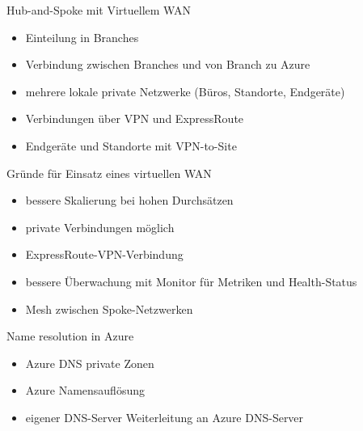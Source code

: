 \begin{flashcard}[]{Hub-and-Spoke mit Virtuellem WAN}
  \begin{itemize}
    \item Einteilung in Branches
    \item Verbindung zwischen Branches und von Branch zu Azure
    \item mehrere lokale private Netzwerke (Büros, Standorte, Endgeräte)
    \item Verbindungen über VPN und ExpressRoute
    \item Endgeräte und Standorte mit VPN-to-Site
  \end{itemize}
\end{flashcard}

\begin{flashcard}[]{Gründe für Einsatz eines virtuellen WAN}
  \begin{itemize}
    \item bessere Skalierung bei hohen Durchsätzen
    \item private Verbindungen möglich
    \item ExpressRoute-VPN-Verbindung
    \item bessere Überwachung mit Monitor für Metriken und Health-Status
    \item Mesh zwischen Spoke-Netzwerken
  \end{itemize}
\end{flashcard}


\begin{flashcard}[]{Name resolution in Azure}
  \begin{itemize}
    \item Azure DNS private Zonen
    \item Azure Namensauflösung
    \item eigener DNS-Server\newline
      Weiterleitung an Azure DNS-Server
  \end{itemize}
\end{flashcard}

